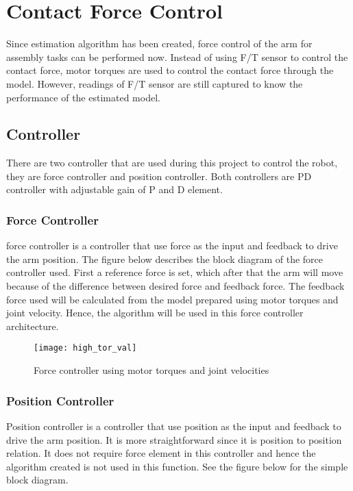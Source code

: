 \chapter{Contact Force Control}

Since estimation algorithm has been created, force control of the arm for assembly tasks can be performed now. Instead of using F/T sensor to control the contact force, motor torques are used to control the contact force through the model. However, readings of F/T sensor are still captured to know the performance of the estimated model.

\section{Controller}
There are two controller that are used during this project to control the robot, they are force controller and position controller. Both controllers are PD controller with adjustable gain of P and D element.

\subsection{Force Controller}

force controller is a controller that use force as the input and feedback to drive the arm position. The figure below describes the block diagram of the force controller used. First a reference force is set, which after that the arm will move because of the difference between desired force and feedback force. The feedback force used will be calculated from the model prepared using motor torques and joint velocity. Hence, the algorithm will be used in this force controller architecture.

\begin{figure}[H]
    \centering
    \texttt{[image: high\_tor\_val]}
    \caption{Force controller using motor torques and joint velocities}
    \label{fig: Force controller}
\end{figure}


\subsection{Position Controller}

Position controller is a controller that use position as the input and feedback to drive the arm position. It is more straightforward since it is position to position relation. It does not require force element in this controller and hence the algorithm created is not used in this function. See the figure below for the simple block diagram.

